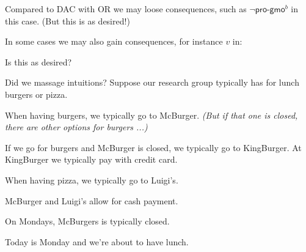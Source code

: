 \documentclass[aspectratio=169]{beamer}
\begin{document}
\begin{frame}{}
    Compared to DAC with OR we may loose consequences, such as $\neg \mathsf{pro\mbox{-}gmo}^b$ in this case. (But this is as desired!)

    \pause

    In some cases we may also gain consequences, for instance $v$ in:

\begin{center}
\end{center}

Is this as desired?
\end{frame}


\begin{frame}{Did we massage intuitions?}
    Suppose our research group typically has for lunch burgers or pizza. 

    When having burgers, we typically go to McBurger. {\it (But if that one is closed, there are other options for burgers ...)}

    \alert{If we go for burgers and McBurger is closed, we typically go to KingBurger. At KingBurger we typically pay with credit card.}

    When having pizza, we typically go to Luigi's.

    McBurger and Luigi's allow for cash payment.

    On Mondays, McBurgers is typically closed.

    Today is Monday and we're about to have lunch.
\end{frame}
\end{document}
